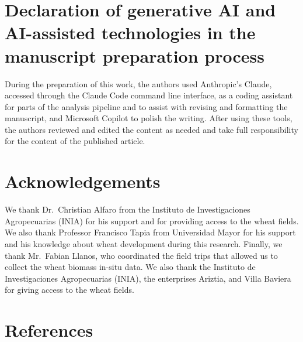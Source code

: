 \documentclass[
  english,
  review,
  number,
  sort,compress,
  authoryear,
  3p]{elsarticle}
\begin{document}
\section*{Declaration of generative AI and AI-assisted technologies in
the manuscript preparation
process}\label{declaration-of-generative-ai-and-ai-assisted-technologies-in-the-manuscript-preparation-process}

During the preparation of this work, the authors used Anthropic's
Claude, accessed through the Claude Code command line interface, as a
coding assistant for parts of the analysis pipeline and to assist with
revising and formatting the manuscript, and Microsoft Copilot to polish
the writing. After using these tools, the authors reviewed and edited
the content as needed and take full responsibility for the content of
the published article.

\section*{Acknowledgements}\label{acknowledgements}

We thank Dr.~Christian Alfaro from the Instituto de Investigaciones
Agropecuarias (INIA) for his support and for providing access to the
wheat fields. We also thank Professor Francisco Tapia from Universidad
Mayor for his support and his knowledge about wheat development during
this research. Finally, we thank Mr.~Fabian Llanos, who coordinated the
field trips that allowed us to collect the wheat biomass in-situ data.
We also thank the Instituto de Investigaciones Agropecuarias (INIA), the
enterprises Ariztia, and Villa Baviera for giving access to the wheat
fields.

\newpage

\section*{References}\label{references}

\renewcommand{\bibsection}{}

\end{document}
